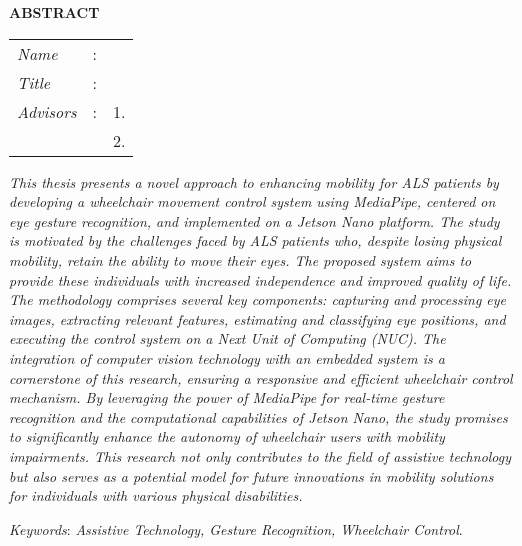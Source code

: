\begin{center}
  \large\textbf{ABSTRACT}
\end{center}


\vspace{2ex}

\begingroup
\setlength{\tabcolsep}{0pt}

\noindent
\begin{tabularx}{\textwidth}{l >{\centering}m{3em} X}
  \emph{Name}     & : & \name{}         \\

  \emph{Title}    & : & \engtatitle{}   \\

  \emph{Advisors} & : & 1. \advisor{}   \\
                  &   & 2. \coadvisor{} \\
\end{tabularx}
\endgroup

\emph{This thesis presents a novel approach to enhancing mobility for ALS patients by developing a wheelchair movement control system using MediaPipe, centered on eye gesture recognition, and implemented on a Jetson Nano platform. The study is motivated by the challenges faced by ALS patients who, despite losing physical mobility, retain the ability to move their eyes. The proposed system aims to provide these individuals with increased independence and improved quality of life. The methodology comprises several key components: capturing and processing eye images, extracting relevant features, estimating and classifying eye positions, and executing the control system on a Next Unit of Computing (NUC). The integration of computer vision technology with an embedded system is a cornerstone of this research, ensuring a responsive and efficient wheelchair control mechanism. By leveraging the power of MediaPipe for real-time gesture recognition and the computational capabilities of Jetson Nano, the study promises to significantly enhance the autonomy of wheelchair users with mobility impairments. This research not only contributes to the field of assistive technology but also serves as a potential model for future innovations in mobility solutions for individuals with various physical disabilities.}

\emph{Keywords}: \emph{Assistive Technology, Gesture Recognition, Wheelchair Control}.

